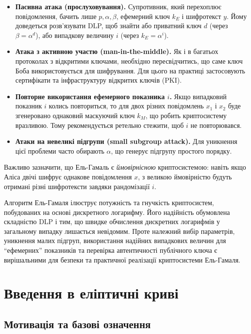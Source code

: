 \documentclass[12pt]{report}
\theoremstyle{definition}
\theoremstyle{plain}
\begin{document}
\begin{itemize}
    \item \textbf{Пасивна атака (прослуховування).} Супротивник, який перехоплює 
          повідомлення, бачить лише \(p, \alpha, \beta\), ефемерний ключ \(k_E\) і шифротекст \(y\). 
          Йому доведеться розв’язувати DLP, щоб знайти або приватний ключ \(d\) (через 
          \(\beta = \alpha^d\)), або випадкову величину \(i\) (через \(k_E = \alpha^i\)).
    \item \textbf{Атака з активною участю (man-in-the-middle).} Як і в багатьох 
          протоколах з відкритими ключами, необхідно пересвідчитись, що саме ключ Боба 
          використовується для шифрування. Для цього на практиці застосовують сертифікати 
          та інфраструктуру відкритих ключів (PKI).
    \item \textbf{Повторне використання ефемерного показника \(i\).} Якщо випадковий 
          показник \(i\) колись повториться, то для двох різних повідомлень \(x_1\) і \(x_2\) 
          буде згенеровано однаковий маскуючий ключ \(k_M\), що робить криптосистему 
          вразливою. Тому рекомендується ретельно стежити, щоб \(i\) не повторювався.
    \item \textbf{Атаки на невеликі підгрупи (small subgroup attack).} Для уникнення 
          цієї проблеми часто обирають \(\alpha\), що генерує підгрупу простого порядку.
\end{itemize}

Важливо зазначити, що Ель-Гамаль є \textit{ймовірнісною} криптосистемою: навіть якщо 
Аліса двічі шифрує однакове повідомлення \(x\), з великою ймовірністю будуть 
отримані різні шифротексти завдяки рандомізації \(i\).

Алгоритм Ель-Гамаля ілюструє потужність та гнучкість криптосистем, побудованих 
на основі дискретного логарифму. Його надійність обумовлена складністю DLP і тим, 
що швидке обчислення дискретних логарифмів у загальному випадку лишається 
невідомим. Проте належний вибір параметрів, уникнення малих підгруп, 
використання надійних випадкових величин для ``ефемерних'' показників 
та перевірка автентичності публічного ключа є вирішальними для безпеки 
та практичної реалізації криптосистеми Ель-Гамаля.

\chapter{Введення в еліптичні криві}
\label{ch:elliptic_curves}

\section{Мотивація та базові означення}
\end{document}
